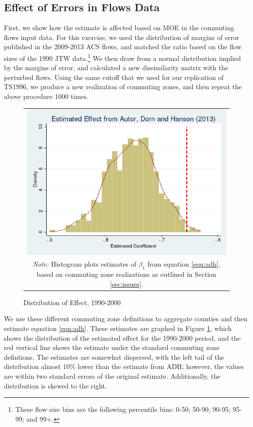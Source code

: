 

\subsection{Effect of Errors in Flows Data}
\FloatBarrier

First, we show how the estimate is affected based on MOE in the commuting flows input data. For this exercise, we used the distribution of margins of error published in the 2009-2013 ACS flows, and matched the ratio based on the flow sizes of the 1990 JTW data.\footnote{These flow size bins are the following percentile bins: 0-50; 50-90; 90-95; 95-99; and 99+.} We then draw from a normal distribution implied by the margins of error, and calculated a new dissimilarity matrix with the perturbed  flows. Using the same cutoff that we used for our replication of TS1996, we produce a new realization of commuting zones, and then repeat the above procedure 1000 times.

\begin{figure}\centering
\caption{Distribution of Effect, 1990-2000 \label{fig:1990dist}}
\begin{tabular}{c}
\includegraphics[scale=.5]{./figures/1990_distribution.png}\\
\multicolumn{1}{p{4.5in}}{\footnotesize \emph{Note:} Histogram plots estimates of $\beta_1$ from equation \ref{eqn:adh}, based on commuting zone realizations as outlined in Section \ref{sec:issues}.}
\end{tabular}
\end{figure}

We use these different commuting zone definitions to aggregate counties and then estimate equation \ref{eqn:adh}. These estimates are graphed in Figure \ref{fig:1990dist}, which shows the distribution of the estimated effect for the 1990-2000 period, and the red vertical line shows the estimate under the standard commuting zone defintions. The estimates are somewhat dispersed, with the left tail of the distribution almost 10\% lower than the estimate from ADH; however, the values are within two standard errors of the original estimate. Additionally, the distribution is skewed to the right.

